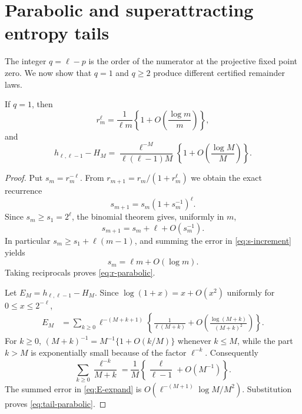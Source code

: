 \section{Parabolic and superattracting entropy tails}
\label{sec:tails}

The integer $q=\ell-p$ is the order of the numerator at the projective fixed
point zero.  We now show that $q=1$ and $q\ge2$ produce different certified
remainder laws.

\begin{theorem}
\label{thm:parabolic}
If $q=1$, then
\begin{equation}
 r_m^\ell=\frac1{\ell m}
 \left\{1+O\left(\frac{\log m}{m}\right)\right\},
 \label{eq:r-parabolic}
\end{equation}
and
\begin{equation}
 h_{\ell,\ell-1}-H_M
 =\frac{\ell^{-M}}{\ell(\ell-1)M}
 \left\{1+O\left(\frac{\log M}{M}\right)\right\}.
 \label{eq:tail-parabolic}
\end{equation}
\end{theorem}

\begin{proof}
Put $s_m=r_m^{-\ell}$.  From
$r_{m+1}=r_m/(1+r_m^\ell)$ we obtain the exact recurrence
\begin{equation}
 s_{m+1}=s_m(1+s_m^{-1})^\ell.
 \label{eq:s-rec}
\end{equation}
Since $s_m\ge s_1=2^\ell$, the binomial theorem gives, uniformly in $m$,
\begin{equation}
 s_{m+1}=s_m+\ell+O(s_m^{-1}).
 \label{eq:s-increment}
\end{equation}
In particular $s_m\ge s_1+\ell(m-1)$, and summing the error in
\cref{eq:s-increment} yields
\begin{equation}
 s_m=\ell m+O(\log m).
 \label{eq:s-asymptotic}
\end{equation}
Taking reciprocals proves \cref{eq:r-parabolic}.

Let $E_M=h_{\ell,\ell-1}-H_M$.  Since
$\log(1+x)=x+O(x^2)$ uniformly for $0\le x\le2^{-\ell}$,
\begin{align}
 E_M
 &=\sum_{k\ge0}\ell^{-(M+k+1)}
 \left\{\frac1{\ell(M+k)}
 +O\left(\frac{\log(M+k)}{(M+k)^2}\right)\right\}.
 \label{eq:E-expand}
\end{align}
For $k\ge0$,
$(M+k)^{-1}=M^{-1}\{1+O(k/M)\}$ whenever $k\le M$, while the part
$k>M$ is exponentially small because of the factor $\ell^{-k}$.
Consequently
\[
 \sum_{k\ge0}\frac{\ell^{-k}}{M+k}
 =\frac1M\left\{\frac{\ell}{\ell-1}+O(M^{-1})\right\}.
\]
The summed error in \cref{eq:E-expand} is
$O(\ell^{-(M+1)}\log M/M^2)$.  Substitution proves
\cref{eq:tail-parabolic}.
\end{proof}

